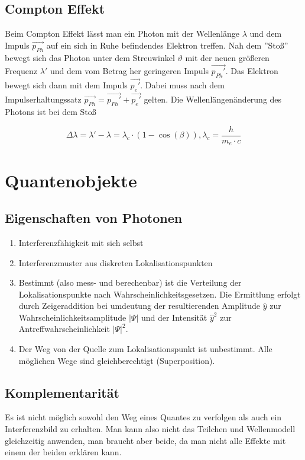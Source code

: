 \documentclass[a4paper]{article}
\begin{document}
								
			
		\subsection{Compton Effekt}
			Beim Compton Effekt lässt man ein Photon mit der Wellenlänge $\lambda$ und dem Impuls $\vec{p_{Ph}}$ auf ein sich in Ruhe befindendes Elektron treffen. Nah dem ''Stoß'' bewegt sich das Photon unter dem Streuwinkel $\vartheta$ mit der neuen größeren Frequenz $\lambda'$ und dem vom Betrag her geringeren Impuls $\vec{p_{Ph}'}$. Das Elektron bewegt sich dann mit dem Impuls $\vec{p_{e}'}$. Dabei muss nach dem Impulserhaltungssatz $\vec{p_{Ph}}=\vec{p_{Ph}'} + \vec{p_{e}'}$ gelten. Die Wellenlängenänderung des Photons ist bei dem Stoß
			
			\begin{equation}
				\Delta\lambda = \lambda'-\lambda = \lambda_c\cdot(1-\cos(\beta)), \lambda_c = \frac{h}{m_e\cdot c}
			\end{equation}
			
	\section{Quantenobjekte}
		\subsection{Eigenschaften von Photonen}
			\begin{enumerate}
				\item Interferenzfähigkeit mit sich selbst
				\item Interferenzmuster aus diskreten Lokalisationspunkten
				\item Bestimmt (also mess- und berechenbar) ist die Verteilung der Lokalisationspunkte nach Wahrscheinlichkeitsgesetzen. Die Ermittlung erfolgt durch Zeigeraddition bei umdeutung der
				\subitem resultierenden Amplitude $\hat{y}$ zur Wahrscheinlichkeitsamplitude $|\Psi|$ und der
				\subitem Intensität $\hat{y}^2$ zur Antreffwahrscheinlichkeit $|\Psi|^2$.
				\item Der Weg von der Quelle zum Lokalisationspunkt ist unbestimmt. Alle möglichen Wege sind gleichberechtigt (Superposition).
			\end{enumerate}
		\subsection{Komplementarität}
			Es ist nicht möglich sowohl den Weg eines Quantes zu verfolgen als auch ein Interferenzbild zu erhalten. Man kann also nicht das Teilchen und Wellenmodell gleichzeitig anwenden, man braucht aber beide, da man nicht alle Effekte mit einem der beiden erklären kann.
\end{document}

